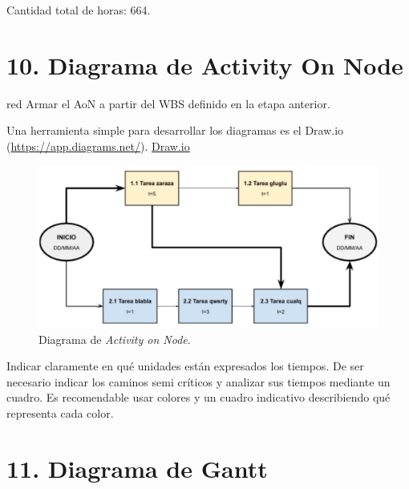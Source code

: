 \documentclass[
11pt, %
]{charter}
\begin{document}
	Cantidad total de horas: 664.

\section{10. Diagrama de Activity On Node}
\label{sec:AoN}

\begin{consigna}{red}
	Armar el AoN a partir del WBS definido en la etapa anterior.

	Una herramienta simple para desarrollar los diagramas es el Draw.io (\url{https://app.diagrams.net/}).
	\href{https://app.diagrams.net}{Draw.io}


	\begin{figure}[htpb]
		\centering
		\includegraphics[width=.8\textwidth]{./Figuras/AoN.png}
		\caption{Diagrama de \textit{Activity on Node}.}
		\label{fig:AoN}
	\end{figure}

	Indicar claramente en qué unidades están expresados los tiempos.
	De ser necesario indicar los caminos semi críticos y analizar sus tiempos mediante un cuadro.
	Es recomendable usar colores y un cuadro indicativo describiendo qué representa cada color.

\end{consigna}

\section{11. Diagrama de Gantt}
\label{sec:gantt}
\end{document}
